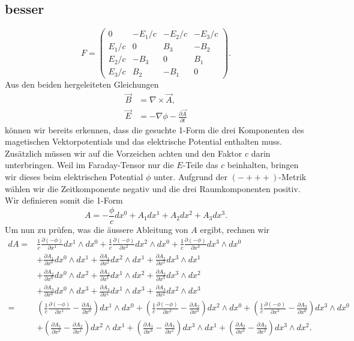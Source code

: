 \subsection{besser}
\begin{equation}
	F = \begin{pmatrix}
		0 & -E_1/c & -E_2/c & -E_3/c \\ E_1/c & 0 & B_3 & -B_2 \\ E_2/c & -B_3 & 0 & B_1 \\ E_3/c & B_2 & -B_1 & 0 
	\end{pmatrix}.
\end{equation}
Aus den beiden hergeleiteten Gleichungen
\begin{align*}
	\vec{B} &= \nabla \times \vec{A},\\
	\vec{E} &= -\nabla \phi -\frac{\partial \vec{A}}{\partial t}
\end{align*}
können wir bereits erkennen, dass die gesuchte 1-Form die drei Komponenten des magetischen Vektorpotentials und das elektrische Potential enthalten muss.
Zusätzlich müssen wir auf die Vorzeichen achten und den Faktor $c$ darin unterbringen.
Weil im Faraday-Tensor nur die $E$-Teile das $c$ beinhalten, bringen wir dieses beim elektrischen Potential $\phi$ unter.
Aufgrund der $(-+++)$-Metrik wählen wir die Zeitkomponente negativ und die drei Raumkomponenten positiv.
Wir definieren somit die 1-Form 
\begin{equation}
	A = -\frac{\phi}{c}dx^0 + A_1 dx^1 + A_2 dx^2 + A_3 dx^3.
\end{equation}
Um nun zu prüfen, was die äussere Ableitung von $A$ ergibt, rechnen wir
\begin{align*}
	dA = 
	& \frac{1}{c}\frac{\partial (-\phi)}{\partial x^1} dx^1 \wedge dx^0
	+ \frac{1}{c}\frac{\partial (-\phi)}{\partial x^2} dx^2 \wedge dx^0
	+ \frac{1}{c}\frac{\partial (-\phi)}{\partial x^3} dx^3 \wedge dx^0\\
	& + \frac{\partial A_1}{\partial x^0} dx^0 \wedge dx^1
	+ \frac{\partial A_1}{\partial x^2} dx^2 \wedge dx^1
	+ \frac{\partial A_1}{\partial x^3} dx^3 \wedge dx^1\\
	& + \frac{\partial A_2}{\partial x^0} dx^0 \wedge dx^2
	+ \frac{\partial A_2}{\partial x^1} dx^1 \wedge dx^2
	+ \frac{\partial A_2}{\partial x^3} dx^3 \wedge dx^2\\
	& + \frac{\partial A_3}{\partial x^0} dx^0 \wedge dx^3
	+ \frac{\partial A_3}{\partial x^1} dx^1 \wedge dx^3
	+ \frac{\partial A_3}{\partial x^2} dx^2 \wedge dx^3\\[2ex] =
	& \left(\frac{1}{c}\frac{\partial (-\phi)}{\partial x^1}-\frac{\partial A_1}{\partial x^0}\right) dx^1 \wedge dx^0 +
	\left(\frac{1}{c}\frac{\partial (-\phi)}{\partial x^2}-\frac{\partial A_2}{\partial x^0}\right) dx^2 \wedge dx^0 +
	\left(\frac{1}{c}\frac{\partial (-\phi)}{\partial x^3}-\frac{\partial A_3}{\partial x^0}\right) dx^3 \wedge dx^0\\
	& + \left(\frac{\partial A_1}{\partial x^2}-\frac{\partial A_2}{\partial x^1}\right) dx^2 \wedge dx^1 +
	\left(\frac{\partial A_1}{\partial x^3}-\frac{\partial A_3}{\partial x^1}\right) dx^3 \wedge dx^1 +
	\left(\frac{\partial A_2}{\partial x^3}-\frac{\partial A_3}{\partial x^2}\right) dx^3 \wedge dx^2.				
\end{align*}
